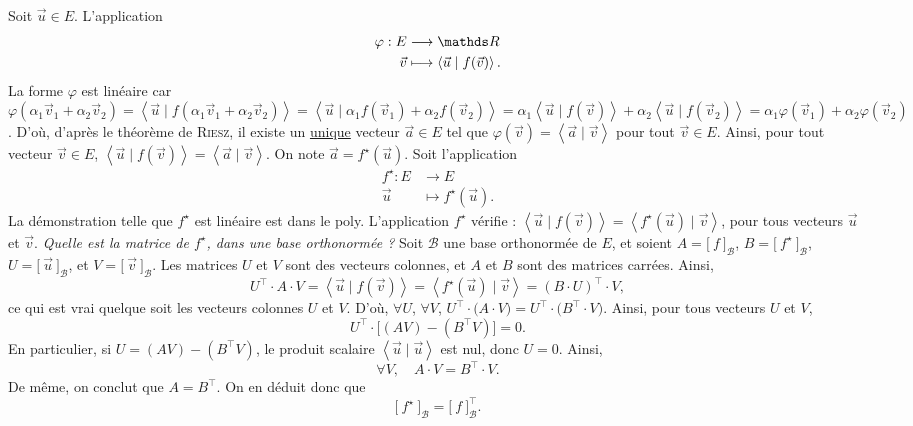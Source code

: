 \begin{prv}
	Soit $\vec{u} \in E$. L'application \begin{align*}
		\varphi: E &\longrightarrow \R \\
		\vec{v} &\longmapsto \left<\vec{u}  \mid f(\vec{v}) \right>.
	\end{align*}
	La forme $\varphi$\/ est linéaire car $\varphi(\alpha_1 \vec{v}_1 + \alpha_2 \vec{v}_2) = \left<\vec{u} \mid f(\alpha_1 \vec{v}_1 + \alpha_2 \vec{v}_2) \right> = \left<\vec{u}  \mid \alpha_1 f(\vec{v}_1) + \alpha_2 f(\vec{v}_2) \right> = \alpha_1\left<\vec{u}  \mid  f(\vec{v}) \right> + \alpha_2 \left<\vec{u}  \mid f(\vec{v}_2) \right> = \alpha_1 \varphi(\vec{v}_1) + \alpha_2 \varphi(\vec{v}_2)$.
	D'où, d'après le théorème de \textsc{Riesz}, il existe un \ul{unique} vecteur $\vec{a} \in E$\/ tel que $\varphi(\vec{v}) = \left<\vec{a}  \mid \vec{v} \right>$\/ pour tout $\vec{v} \in E$.
	Ainsi, pour tout vecteur $\vec{v} \in E$, $\left<\vec{u}  \mid f(\vec{v}) \right> = \left<\vec{a}  \mid \vec{v} \right>$.
	On note $\vec{a} = f^\star(\vec{u})$.
	Soit l'application \begin{align*}
		f^\star : E &\longrightarrow E \\
		\vec{u} &\longmapsto f^\star(\vec{u}).
	\end{align*}
	La démonstration telle que $f^\star $\/ est linéaire est dans le poly.
	L'application $f^\star$\/ vérifie : $\left< \vec{u} \mid f(\vec{v}) \right> = \left<f^\star (\vec{u})  \mid \vec{v} \right>$, pour tous vecteurs $\vec{u}$\/ et $\vec{v}$.
	\textsl{Quelle est la matrice de $f^\star$, dans une base orthonormée ?}\@
	Soit $\mathcal{B}$\/ une base orthonormée de $E$, et soient $A = \big[\:f\:\big]_\mathcal{B}$, $B = \big[\:f^\star \:\big]_\mathcal{B}$, $U = \big[\:\vec{u}\:\big]_\mathcal{B}$, et $V = \big[\:\vec{v}\:\big]_\mathcal{B}$.
	Les matrices $U$\/ et $V$\/ sont des vecteurs colonnes, et $A$\/ et $B$\/ sont des matrices carrées.
	Ainsi, \[
		U^\top \cdot A \cdot V = \left< \vec{u}  \mid f(\vec{v}) \right> 
		= \left<f^\star (\vec{u})  \mid \vec{v} \right> = (B\cdot U)^\top \cdot V,
	\] ce qui est vrai quelque soit les vecteurs colonnes $U$\/ et $V$.
	D'où, $\forall U$, $\forall V$, $U^\top \cdot \big(A \cdot V\big) = U^\top \cdot \big(B^\top \cdot V\big)$.
	Ainsi, pour tous vecteurs $U$\/ et $V$, \[
		U^\top \cdot \Big[ (AV) - (B^\top V)\Big] = 0
	.\] En particulier, si $U = (AV) - (B^\top V)$, le produit scalaire $\left<\vec{u}  \mid \vec{u} \right>$\/ est nul, donc $U = 0$.
	Ainsi, \[
		\forall V,\quad A\cdot V = B^\top\cdot  V
	.\] De même, on conclut que $A = B^\top$. On en déduit donc que \[
	\big[\:f^\star\:\big]_\mathcal{B} = \big[\:f\:\big]_\mathcal{B}^\top
	.\]
\end{prv}

